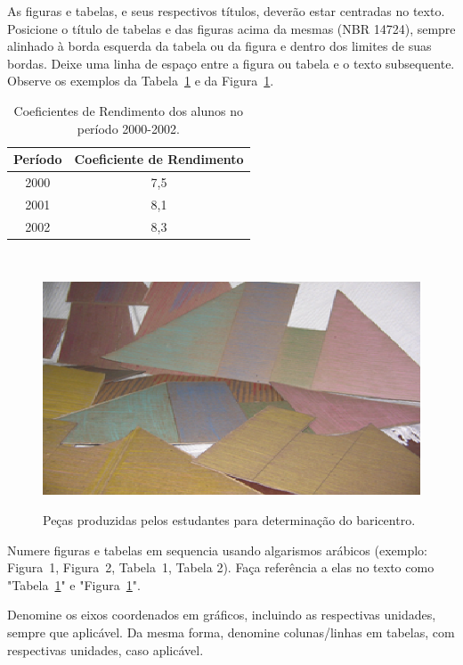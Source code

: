 \documentclass[12pt,a4paper]{article}
\begin{document}
As figuras e tabelas, e seus respectivos títulos, deverão estar centradas no texto. Posicione o título de tabelas e das figuras acima da mesmas (NBR 14724), sempre alinhado à borda esquerda da tabela ou da figura e dentro dos limites de suas bordas. Deixe uma linha de espaço entre a figura ou tabela e o texto subsequente. Observe os exemplos da Tabela~\ref{tab:coeficiente} e da Figura~\ref{fig:pecas}.
	
\begin{table}[h]
	\centering
	\caption{Coeficientes de Rendimento dos alunos no período 2000-2002.}\label{tab:coeficiente}
	\begin{tabular}{c|c}
		\hline
		Período & Coeficiente de Rendimento\\
				\hline %
		2000  & 7,5 \\\hline
		2001 & 8,1 \\\hline
		2002 & 8,3 \\
		\hline
	\end{tabular}\\	
\end{table}

\begin{figure}[h!]
\centering
\caption{Peças produzidas pelos estudantes para determinação do baricentro.}\label{fig:pecas}
\includegraphics[width=0.9\linewidth]{Figuras/OI.png}\\
\vspace{2mm}
\end{figure}

Numere figuras e tabelas em sequencia usando algarismos arábicos (exemplo: Figura~1, Figura~2, Tabela~1, Tabela 2). Faça referência a elas no texto como "Tabela~\ref{tab:coeficiente}" e "Figura~\ref{fig:pecas}".

Denomine os eixos coordenados em gráficos, incluindo as respectivas unidades, sempre que aplicável. Da mesma forma, denomine colunas/linhas em tabelas, com respectivas unidades, caso aplicável.
\end{document}
